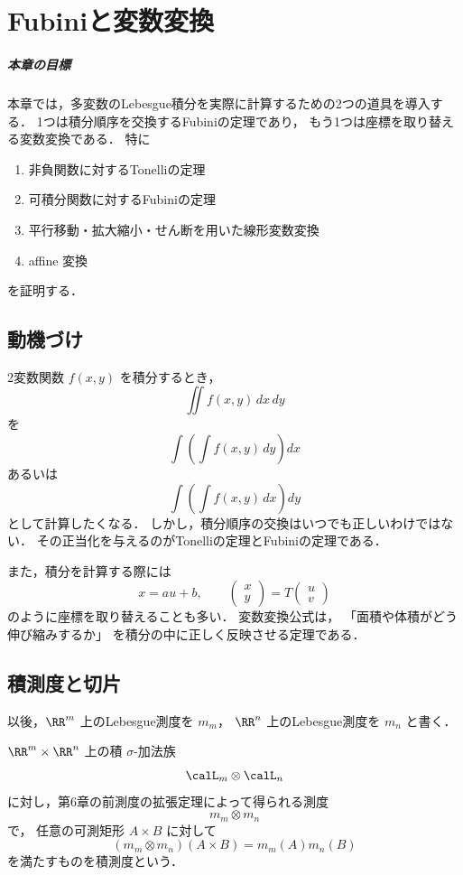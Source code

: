 \chapter{Fubiniと変数変換}

\paragraph{本章の目標}
本章では，多変数のLebesgue積分を実際に計算するための2つの道具を導入する．
1つは積分順序を交換するFubiniの定理であり，
もう1つは座標を取り替える変数変換である．
特に
\begin{enumerate}
    \item 非負関数に対するTonelliの定理
    \item 可積分関数に対するFubiniの定理
    \item 平行移動・拡大縮小・せん断を用いた線形変数変換
    \item affine 変換
\end{enumerate}
を証明する．

\section{動機づけ}

2変数関数 $f(x,y)$ を積分するとき，
\[
\iint f(x,y)\,dx\,dy
\]
を
\[
\int\left(\int f(x,y)\,dy\right)dx
\]
あるいは
\[
\int\left(\int f(x,y)\,dx\right)dy
\]
として計算したくなる．
しかし，積分順序の交換はいつでも正しいわけではない．
その正当化を与えるのがTonelliの定理とFubiniの定理である．

また，積分を計算する際には
\[
x=au+b,\qquad
\begin{pmatrix}x\\ y\end{pmatrix}
=
T\begin{pmatrix}u\\ v\end{pmatrix}
\]
のように座標を取り替えることも多い．
変数変換公式は，
「面積や体積がどう伸び縮みするか」
を積分の中に正しく反映させる定理である．

\section{積測度と切片}

以後，$\RR^m$ 上のLebesgue測度を $m_m$，
$\RR^n$ 上のLebesgue測度を $m_n$ と書く．

\begin{definition}[積測度]
$\RR^m\times\RR^n$ 上の積 $\sigma$-加法族
\[
\calL_m\otimes \calL_n
\]
に対し，第6章の前測度の拡張定理によって得られる測度
\[
m_m\otimes m_n
\]
で，
任意の可測矩形 $A\times B$ に対して
\[
(m_m\otimes m_n)(A\times B)=m_m(A)m_n(B)
\]
を満たすものを積測度という．
\end{definition}

